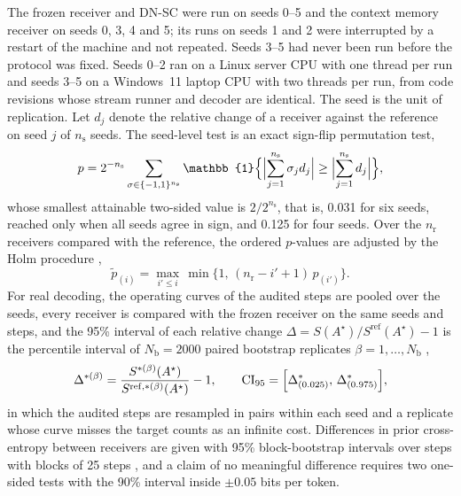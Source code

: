 The frozen receiver and DN-SC were run on seeds 0--5 and the context memory receiver on seeds 0, 3, 4 and 5; its runs on seeds 1 and 2 were interrupted by a restart of the machine and not repeated. Seeds 3--5 had never been run before the protocol was fixed. Seeds 0--2 ran on a Linux server CPU with one thread per run and seeds 3--5 on a Windows~11 laptop CPU with two threads per run, from code revisions whose stream runner and decoder are identical. The seed is the unit of replication. Let $d_j$ denote the relative change of a receiver against the reference on seed $j$ of $n_\mathrm{s}$ seeds. The seed-level test is an exact sign-flip permutation test,
\begin{equation}
p = 2^{-n_\mathrm{s}}\sum_{\vect{\sigma}\in\{-1,1\}^{n_\mathrm{s}}}\mathbb{1}\Bigl\{\Bigl|\sum_{j=1}^{n_\mathrm{s}}\sigma_j d_j\Bigr| \ge \Bigl|\sum_{j=1}^{n_\mathrm{s}} d_j\Bigr|\Bigr\},
\label{eq:signflip}
\end{equation}
whose smallest attainable two-sided value is $2/2^{n_\mathrm{s}}$, that is, 0.031 for six seeds, reached only when all seeds agree in sign, and 0.125 for four seeds. Over the $n_\mathrm{r}$ receivers compared with the reference, the ordered $p$-values are adjusted by the Holm procedure \cite{holm1979},
\begin{equation}
\tilde{p}_{(i)} = \max_{i'\le i}\,\min\bigl\{1,\,(n_\mathrm{r}-i'+1)\,p_{(i')}\bigr\}.
\label{eq:holm}
\end{equation}
For real decoding, the operating curves of the audited steps are pooled over the seeds, every receiver is compared with the frozen receiver on the same seeds and steps, and the 95\% interval of each relative change $\Delta = S(A^\star)/S^\mathrm{ref}(A^\star)-1$ is the percentile interval of $N_\mathrm{b} = 2000$ paired bootstrap replicates $\beta = 1,\dots,N_\mathrm{b}$ \cite{efron1993},
\begin{equation}
\Delta^{*(\beta)} = \frac{S^{*(\beta)}(A^\star)}{S^{\mathrm{ref},*(\beta)}(A^\star)}-1,\qquad
\mathrm{CI}_{95} = \Bigl[\Delta^{*}_{(0.025)},\,\Delta^{*}_{(0.975)}\Bigr],
\label{eq:bootstrap}
\end{equation}
in which the audited steps are resampled in pairs within each seed and a replicate whose curve misses the target counts as an infinite cost. Differences in prior cross-entropy between receivers are given with 95\% block-bootstrap intervals over steps with blocks of 25 steps \cite{kunsch1989}, and a claim of no meaningful difference requires two one-sided tests \cite{schuirmann1987} with the 90\% interval inside $\pm0.05$ bits per token.
